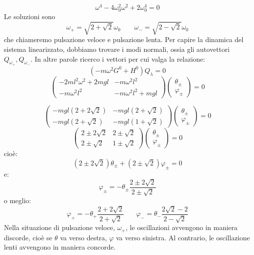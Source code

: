 \documentclass[a4paper,openany]{article}
\begin{document}
	$$
	\omega^{4} - 4\omega_{0}^2\omega^{2} +2 \omega_{0}^{4} = 0
	$$
	Le soluzioni sono
	$$
	\omega_{+} = \sqrt{2+\sqrt{2}}\omega_0 \>\>\>\>\>\>\>\>\> \omega_{-} = \sqrt{2-\sqrt{2}}\omega_0
	$$
	che chiameremo pulsazione veloce e pulsazione lenta. Per capire la dinamica del sistema linearizzato, dobbiamo trovare i modi normali, ossia gli autovettori $Q_{\omega_{+}}, Q_{\omega_{-}}$. In altre parole ricerco i vettori per cui valga la relazione:
	\begin{equation}\label{key}
		(-m\omega^{2}G^0 + H^0)Q_{\lambda} = 0
	\end{equation}
	\begin{equation*}\label{key}
		\begin{pmatrix}
			-2ml^2\omega^2 + 2mgl & -m\omega^{2}l^2 \\
			-m\omega^{2}l^{2} & -m\omega^{2}l^2+mgl
		\end{pmatrix}
		\begin{pmatrix}
			\theta_{\pm} \\ \varphi_{\pm}
		\end{pmatrix} = 0
	\end{equation*}
	
	\begin{equation*}\label{key}
		\begin{pmatrix}
			-mgl(2+2\sqrt{2}) & -mgl(2+\sqrt{2}) \\
			-mgl(2+\sqrt{2}) & -mgl(1+\sqrt{2})
		\end{pmatrix}
		\begin{pmatrix}
			\theta_{\pm} \\ \varphi_{\pm}
		\end{pmatrix} = 0
	\end{equation*}
	\begin{equation*}\label{key}
		\begin{pmatrix}
			2\pm2\sqrt{2} & 2\pm\sqrt{2} \\
			2\pm\sqrt{2} & 1\pm\sqrt{2}
		\end{pmatrix}
		\begin{pmatrix}
			\theta_{\pm} \\ \varphi_{\pm}
		\end{pmatrix} = 0
	\end{equation*}
	cioè:
	$$
	(2\pm2\sqrt{2})\theta_{\pm} + (2\pm\sqrt{2})\varphi_{\pm} = 0
	$$
	e:
	$$
	\varphi_{\pm} = -\theta_{\pm}\dfrac{2\pm2\sqrt{2}}{2\pm\sqrt{2}}
	$$
	o meglio:
	$$
	\varphi_{+} = -\theta_{+}\dfrac{2+2\sqrt{2}}{2+\sqrt{2}}  \>\>\>\>\>\>\>\> \varphi_{-} = \theta_{-}\dfrac{2\sqrt{2}-2}{2-\sqrt{2}}
	$$
	Nella situazione di pulsazione veloce, $\omega_{+}$, le oscillazioni avvengono in maniera discorde, cioè se $\theta$ va verso destra, $\varphi$ va verso sinistra. Al contrario, le oscillazione lenti avvengono in maniera concorde.
\end{document}
